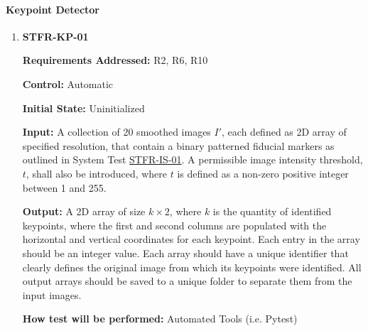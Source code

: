 \documentclass[12pt, titlepage]{article}
\begin{document}
\paragraph{Keypoint Detector}
\begin{enumerate}
\item \hypertarget{STFR-KP-01}{\textbf{STFR-KP-01}\\}
\textbf{Requirements Addressed:} R2, R6, R10

\textbf{Control:} Automatic	

\textbf{Initial State:} Uninitialized			

\textbf{Input:} A collection of 20 smoothed images $I'$, each defined as 2D array of specified resolution, that 
contain a binary patterned fiducial markers as outlined in System Test \hyperlink{STFR-IS-01}{STFR-IS-01}. 
A permissible image intensity threshold, $t$, shall also be introduced, where $t$ is defined as a non-zero 
positive integer between 1 and 255.

\textbf{Output:} A 2D array of size $k \times 2$, where $k$ is the quantity of identified keypoints, 
where the first and second columns are populated with the horizontal and vertical coordinates for each 
keypoint. Each entry in the array should be an integer value. Each array should have a unique identifier that 
clearly defines the original image from which its keypoints were identified. All output arrays should be saved 
to a unique folder to separate them from the input images.

\textbf{How test will be performed:} Automated Tools (i.e. Pytest)
\end{enumerate}
\end{document}
